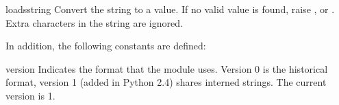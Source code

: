 \begin{funcdesc}{loads}{string}
  Convert the string to a value.  If no valid value is found, raise
  ,  or
  .  Extra characters in the string are ignored.
\end{funcdesc}

In addition, the following constants are defined:

\begin{datadesc}{version}
  Indicates the format that the module uses. Version 0 is the
  historical format, version 1 (added in Python 2.4) shares
  interned strings. The current version is 1.

\end{datadesc}